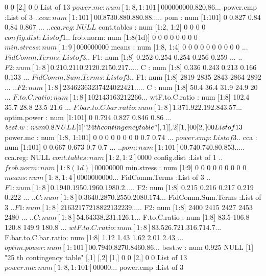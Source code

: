 \documentclass[11pt]{article} %
\begin{document}
\begin{Schunk}
\begin{Soutput}
     [,1] [,2]
[1,]    0    0
[2,]    0    0
List of 13
 $ power.mc            : num [1:8, 1:101] 0 0 0 0 0 0 0 0 0.82 0.86 ...
 $ power.cmp           :List of 3
  ..$ cca    : num [1:101] 0 0.873 0.88 0.88 0.88 ...
  ..$ pom    : num [1:101] 0 0.827 0.84 0.84 0.867 ...
  ..$ cca.reg: NULL
 $ cont.tables         : num [1:2, 1:2] 0 0 0 0
 $ config.dist         :List of 1
  ..$ frob.norm: num [1:8(1d)] 0 0 0 0 0 0 0 0
 $ min.stress          : num [1:9] 0 0 0 0 0 0 0 0 0
 $ means               : num [1:8, 1:4] 0 0 0 0 0 0 0 0 0 0 ...
 $ FidComm.Terms       :List of 3
  ..$ F1: num [1:8] 0.252 0.254 0.254 0.256 0.259 ...
  ..$ F2: num [1:8] 0.21 0.211 0.212 0.215 0.217 ...
  ..$ C : num [1:8] 0.336 0.243 0.213 0.166 0.133 ...
 $ FidComm.Sum.Terms   :List of 3
  ..$ F1: num [1:8] 2819 2835 2843 2864 2892 ...
  ..$ F2: num [1:8] 2346 2363 2374 2402 2421 ...
  ..$ C : num [1:8] 50.4 36.4 31.9 24.9 20 ...
 $ F.to.C.ratio        : num [1:8] 102 143 163 212 266 ...
 $ wtF.to.C.ratio      : num [1:8] 102.4 35.7 28.8 23.5 21.6 ...
 $ F.bar.to.C.bar.ratio: num [1:8] 1.37 1.92 2.19 2.84 3.57 ...
 $ optim.power         : num [1:101] 0 0.794 0.827 0.846 0.86 ...
 $ best.w              : num 0.8
NULL
[1] "24 th contingency table"
     [,1] [,2]
[1,]    0    0
[2,]    0    0
List of 13
 $ power.mc            : num [1:8, 1:101] 0 0 0 0 0 0 0 0 0.7 0.74 ...
 $ power.cmp           :List of 3
  ..$ cca    : num [1:101] 0 0.667 0.673 0.7 0.7 ...
  ..$ pom    : num [1:101] 0 0.74 0.74 0.8 0.853 ...
  ..$ cca.reg: NULL
 $ cont.tables         : num [1:2, 1:2] 0 0 0 0
 $ config.dist         :List of 1
  ..$ frob.norm: num [1:8(1d)] 0 0 0 0 0 0 0 0
 $ min.stress          : num [1:9] 0 0 0 0 0 0 0 0 0
 $ means               : num [1:8, 1:4] 0 0 0 0 0 0 0 0 0 0 ...
 $ FidComm.Terms       :List of 3
  ..$ F1: num [1:8] 0.194 0.195 0.196 0.198 0.2 ...
  ..$ F2: num [1:8] 0.215 0.216 0.217 0.219 0.222 ...
  ..$ C : num [1:8] 0.364 0.287 0.255 0.208 0.174 ...
 $ FidComm.Sum.Terms   :List of 3
  ..$ F1: num [1:8] 2163 2177 2188 2213 2239 ...
  ..$ F2: num [1:8] 2400 2415 2427 2453 2480 ...
  ..$ C : num [1:8] 54.6 43 38.2 31.1 26.1 ...
 $ F.to.C.ratio        : num [1:8] 83.5 106.8 120.8 149.9 180.8 ...
 $ wtF.to.C.ratio      : num [1:8] 83.5 26.7 21.3 16.7 14.7 ...
 $ F.bar.to.C.bar.ratio: num [1:8] 1.12 1.43 1.62 2.01 2.43 ...
 $ optim.power         : num [1:101] 0 0.794 0.827 0.846 0.86 ...
 $ best.w              : num 0.925
NULL
[1] "25 th contingency table"
     [,1] [,2]
[1,]    0    0
[2,]    0    0
List of 13
 $ power.mc            : num [1:8, 1:101] 0 0 0 0 0 ...
 $ power.cmp           :List of 3

\end{Soutput}
\end{Schunk}
\end{document}

